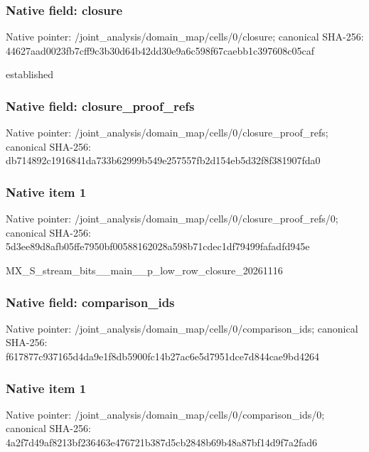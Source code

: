 \documentclass[10pt,a4paper]{article}
\begin{document}
\subsubsection{Native field: closure}
Native pointer: /joint\_\allowbreak{}analysis/domain\_\allowbreak{}map/cells/0/closure; canonical SHA-256: 44627aad0023fb7cff9c3b30d64b42dd30e9a6c598f67caebb1c397608c05caf

\begingroup\raggedright\sloppy established\par\endgroup

\subsubsection{Native field: closure\_\allowbreak{}proof\_\allowbreak{}refs}
Native pointer: /joint\_\allowbreak{}analysis/domain\_\allowbreak{}map/cells/0/closure\_\allowbreak{}proof\_\allowbreak{}refs; canonical SHA-256: db714892c1916841da733b62999b549e257557fb2d154eb5d32f8f381907fda0

\subsubsection{Native item 1}
Native pointer: /joint\_\allowbreak{}analysis/domain\_\allowbreak{}map/cells/0/closure\_\allowbreak{}proof\_\allowbreak{}refs/0; canonical SHA-256: 5d3ee89d8afb05ffe7950bf00588162028a598b71cdec1df79499fafadfd945e

\begingroup\raggedright\sloppy MX\_\allowbreak{}S\_\allowbreak{}stream\_\allowbreak{}bits\_\allowbreak{}\_\allowbreak{}main\_\allowbreak{}\_\allowbreak{}p\_\allowbreak{}low\_\allowbreak{}row\_\allowbreak{}closure\_\allowbreak{}20261116\par\endgroup

\subsubsection{Native field: comparison\_\allowbreak{}ids}
Native pointer: /joint\_\allowbreak{}analysis/domain\_\allowbreak{}map/cells/0/comparison\_\allowbreak{}ids; canonical SHA-256: f617877c937165d4da9e1f8db5900fc14b27ac6e5d7951dce7d844cae9bd4264

\subsubsection{Native item 1}
Native pointer: /joint\_\allowbreak{}analysis/domain\_\allowbreak{}map/cells/0/comparison\_\allowbreak{}ids/0; canonical SHA-256: 4a2f7d49af8213bf236463e476721b387d5cb2848b69b48a87bf14d9f7a2fad6
\end{document}
